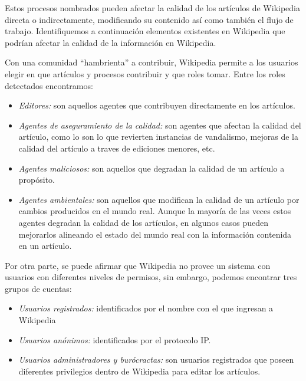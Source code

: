 Estos procesos nombrados pueden afectar la calidad de los art\'iculos de Wikipedia directa o indirectamente, modificando su contenido as\'i como tambi\'en el flujo de trabajo. Identifiquemos a continuaci\'on elementos existentes en Wikipedia que podr\'ian afectar la calidad de la informaci\'on en Wikipedia.

Con una comunidad ``hambrienta'' a contribuir, Wikipedia permite a los usuarios elegir en que art\'iculos y procesos contribuir y que roles tomar. Entre los roles detectados encontramos:

\begin{itemize}
\item \emph{Editores:} son aquellos agentes que contribuyen directamente en los art\'iculos.
\item \emph{Agentes de aseguramiento de la calidad:}  son agentes que afectan la calidad del art\'iculo, como lo son lo que revierten instancias de vandalismo, mejoras de la calidad del art\'iculo a traves de ediciones menores, etc.
\item \emph{Agentes maliciosos:} son aquellos que degradan la calidad de un art\'iculo a prop\'osito.
\item \emph{Agentes ambientales:} son aquellos que modifican la calidad de un art\'iculo por cambios producidos en el mundo real.
Aunque la mayor\'ia de las veces estos agentes degradan la calidad de los art\'iculos, en algunos casos pueden mejorarlos alineando el estado del mundo real con la informaci\'on contenida en un art\'iculo.
\end{itemize}

Por otra parte, se puede afirmar que Wikipedia no provee un sistema con usuarios con diferentes niveles de permisos, sin embargo, podemos encontrar tres grupos de cuentas:

\begin{itemize}
\item \emph{Usuarios registrados:} identificados por el nombre con el que ingresan a Wikipedia
\item \emph{Usuarios an\'onimos:} identificados por el protocolo IP.
\item \emph{Usuarios administradores y bur\'ocractas:} son usuarios registrados que poseen diferentes privilegios dentro de Wikipedia para editar los art\'iculos.
\end{itemize}

